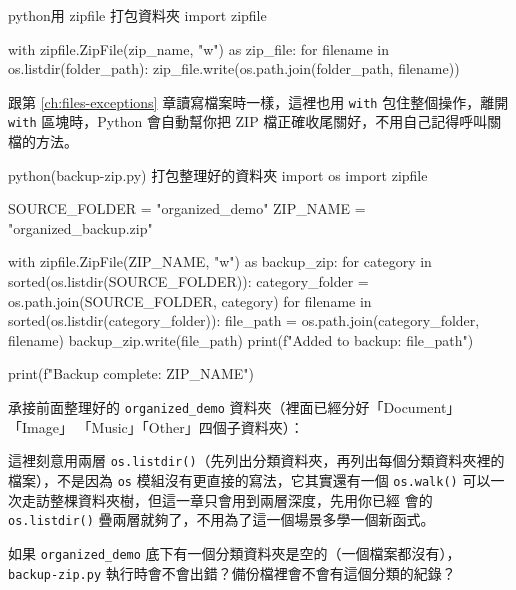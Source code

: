 \begin{code}{python}{用 zipfile 打包資料夾}
import zipfile

with zipfile.ZipFile(zip_name, "w") as zip_file:
    for filename in os.listdir(folder_path):
        zip_file.write(os.path.join(folder_path, filename))
\end{code}

跟第 \ref{ch:files-exceptions} 章讀寫檔案時一樣，這裡也用 \texttt{with} 包住整個操作，離開 \texttt{with}
區塊時，Python 會自動幫你把 ZIP 檔正確收尾關好，不用自己記得呼叫關檔的方法。

\begin{example}{python}{(backup-zip.py) 打包整理好的資料夾}
import os
import zipfile

SOURCE_FOLDER = "organized_demo"
ZIP_NAME = "organized_backup.zip"

with zipfile.ZipFile(ZIP_NAME, "w") as backup_zip:
    for category in sorted(os.listdir(SOURCE_FOLDER)):
        category_folder = os.path.join(SOURCE_FOLDER, category)
        for filename in sorted(os.listdir(category_folder)):
            file_path = os.path.join(category_folder, filename)
            backup_zip.write(file_path)
            print(f"Added to backup: {file_path}")

print(f"Backup complete: {ZIP_NAME}")
\end{example}

承接前面整理好的 \texttt{organized\_demo} 資料夾（裡面已經分好「Document」「Image」
「Music」「Other」四個子資料夾）：


這裡刻意用兩層 \texttt{os.listdir()}（先列出分類資料夾，再列出每個分類資料夾裡的
檔案），不是因為 \texttt{os} 模組沒有更直接的寫法，它其實還有一個
\texttt{os.walk()} 可以一次走訪整棵資料夾樹，但這一章只會用到兩層深度，先用你已經
會的 \texttt{os.listdir()} 疊兩層就夠了，不用為了這一個場景多學一個新函式。

\begin{drills}[label=drills:backup-zip]
\item 如果 \texttt{organized\_demo} 底下有一個分類資料夾是空的（一個檔案都沒有），
\texttt{backup-zip.py} 執行時會不會出錯？備份檔裡會不會有這個分類的紀錄？
\end{drills}

